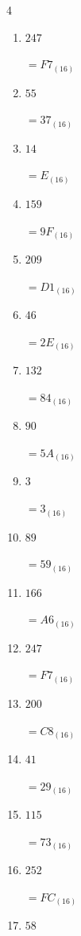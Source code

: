 \begin{multicols}{4}
\begin{enumerate}
  \item $247$

        $=F7_{(16)}$

  \item $55$

        $=37_{(16)}$

  \item $14$

        $=E_{(16)}$

  \item $159$

        $=9F_{(16)}$

  \item $209$

        $=D1_{(16)}$

\columnbreak %

  \item $46$

        $=2E_{(16)}$

  \item $132$

        $=84_{(16)}$

  \item $90$

        $=5A_{(16)}$

  \item $3$

        $=3_{(16)}$

  \item $89$

        $=59_{(16)}$

  \item $166$

        $=A6_{(16)}$

  \item $247$

        $=F7_{(16)}$

  \item $200$

        $=C8_{(16)}$

  \item $41$

        $=29_{(16)}$

  \item $115$

        $=73_{(16)}$

  \item $252$

        $=FC_{(16)}$

  \item $58$


\end{enumerate}
\end{multicols}
